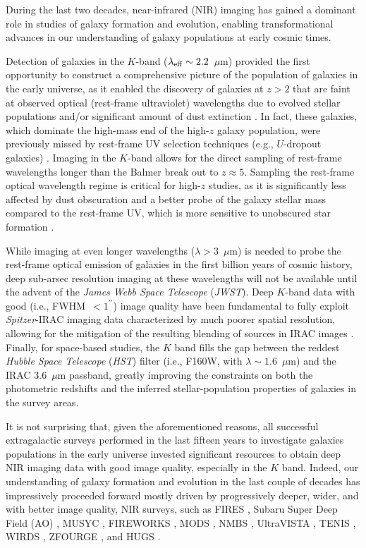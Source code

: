\documentclass[preprint2]{aastex6}
\gdef\arcsec{^{\prime\prime}}
\begin{document}
During the last two decades, near-infrared (NIR) imaging has gained a dominant role in studies of galaxy formation and evolution, enabling transformational advances in our understanding of galaxy populations at early cosmic times.

Detection of galaxies in the $K$-band ($\lambda_{\rm eff} \sim 2.2$~$\mu$m) provided the first opportunity to construct a comprehensive picture of the population of galaxies in the early universe, as it enabled the discovery of galaxies at $z > 2$ that are faint at observed optical (rest-frame ultraviolet) wavelengths due to evolved stellar populations and/or significant amount of dust extinction \citep[e.g.,][]{franx:03, labbe:03, forster:04, minowa:05, kajisawa:06, brammer:07, taylor:09a}. In fact, these galaxies, which dominate the high-mass end of the high-$z$ galaxy population, were previously missed by rest-frame UV selection techniques (e.g., $U$-dropout galaxies) \citep[e.g.,][]{vandokkum:06}. Imaging in the $K$-band allows for the direct sampling of rest-frame wavelengths longer than the Balmer break out to $z\approx5$. Sampling the rest-frame optical wavelength regime is critical for high-$z$ studies, as it is significantly less affected by dust obscuration and a better probe of the galaxy stellar mass compared to the rest-frame UV, which is more sensitive to unobscured star formation \citep[e.g., ][]{fontana:06, marchesini:09}. 

While imaging at even longer wavelengths ($\lambda>3$~$\mu$m) is needed to probe the rest-frame optical emission of galaxies in the first billion years of cosmic history, deep sub-arsec resolution imaging at these wavelengths will not be available until the advent of the {\it James Webb Space Telescope} ({\it JWST}). Deep $K$-band data with good  (i.e., FWHM~$<1\arcsec$) image quality have been fundamental to fully exploit {\it Spitzer}-IRAC imaging data characterized by much poorer spatial resolution, allowing for the mitigation of the resulting blending of sources in IRAC images \citep[e.g.,][]{labbe:05}. Finally, for space-based studies, the $K$ band fills the gap between the reddest {\it Hubble Space Telescope} ({\it HST}) filter (i.e., F160W, with $\lambda \sim 1.6$~$\mu$m) and the IRAC 3.6~$\mu$m passband, greatly improving the constraints on both the photometric redshifts and the inferred stellar-population properties of galaxies in the survey areas. 

It is not surprising that, given the aforementioned reasons, all successful extragalactic surveys performed in the last fifteen years to investigate galaxies populations in the early universe invested significant resources to obtain deep NIR imaging data with good image quality, especially in the $K$ band. Indeed, our understanding of galaxy formation and evolution in the last couple of decades has impressively proceeded forward mostly driven by progressively deeper, wider, and with better image quality, NIR surveys, such as FIRES \citep{labbe:03}, Subaru Super Deep Field (AO) \citep{minowa:05}, MUSYC \citep{quadri:07, taylor:09b}, FIREWORKS \citep{wuyts:fireworks}, MODS \citep{kajisawa:11}, NMBS \citep{whitaker:nmbs}, UltraVISTA \citep{mccracken:ultravista}, TENIS \citep{hsieh:tenis}, WIRDS \citep{bielby:12}, ZFOURGE \citep{spitler:12}, and HUGS \citep{hugs}.
\end{document}
